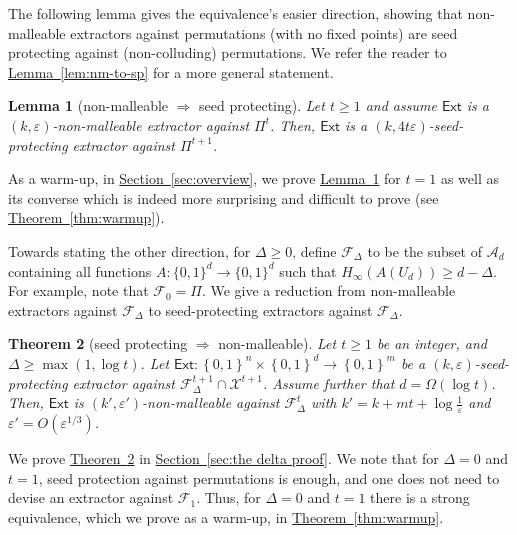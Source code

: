 \documentclass[11pt]{article}
\numberwithin{equation}{section}
\newtheorem{theorem}{Theorem}[section]
\newtheorem{lemma}[theorem]{Lemma}
\theoremstyle{definition}
\theoremstyle{plain}
\newcommand{\expref}[2]{\hyperref[#2]{#1~\ref{#2}}}
\newcommand{\ext}{\mathsf{Ext}}
\newcommand{\advfam}{\mathcal{A}}
\newcommand{\eps}{\varepsilon}
\newcommand{\perfam}{\Pi}
\newcommand{\nc}{\mathcal{X}}
\newcommand{\me}{{H_{\infty}}}
\newcommand{\set}[1]{\left\{{#1}\right\}}
\newcommand{\B}{\set{0,1}}
\begin{document}
The following lemma gives the equivalence's easier direction, showing that non-malleable extractors against permutations (with no fixed points) are seed protecting against (non-colluding) permutations. We refer the reader to \expref{Lemma}{lem:nm-to-sp} for a more general statement.

\begin{lemma}[non-malleable $\Longrightarrow$ seed protecting]\label{lem:intro nm is sp}
	Let $t \ge 1$ and assume $\ext$ is a $(k,\eps)$-non-malleable extractor
	against $\Pi^t$. Then, $\ext$ is a $(k,4t\eps)$-seed-protecting extractor against $\Pi^{t+1}$.
\end{lemma}

As a %
warm-up,  %
in \expref{Section}{sec:overview}, we prove \expref{Lemma}{lem:intro nm is sp} for $t=1$ as well as its converse which is indeed more surprising and difficult to prove (see \expref{Theorem}{thm:warmup}). 

Towards stating the other direction, 
for $\Delta \ge 0$, define $\mathcal{F}_{\Delta}$ to be the subset of $\advfam_d$ containing all functions $A \colon \{0,1\}^d \to \{0,1\}^d$ such that 
$\me(A(U_d)) \ge d-\Delta$. %
%
%
For example, note that $\mathcal{F}_0 = \perfam$. We
give a reduction from non-malleable extractors against $\mathcal{F}_\Delta$ to seed-protecting extractors against $\mathcal{F}_\Delta$. 

\begin{theorem}[seed protecting $\Longrightarrow$ non-malleable]\label{thm:last one}
	Let $t \ge 1$ be an integer, and $\Delta \ge \max(1,\log{t})$.
	Let $\ext\colon\B^{n}\times\B^{d}\rightarrow\B^m$ be a $(k,\eps)$-seed-protecting extractor against $\mathcal{F}^{t+1}_{\Delta} \cap \nc^{t+1}$. Assume further that $d = \Omega(\log{t})$. Then, $\ext$ is $(k',\eps')$-non-malleable against $\mathcal{F}_{\Delta}^t$ with $k' = k+mt+\log\frac1{\eps}$ and $\eps' = O(\eps^{1/3})$.
\end{theorem}

We prove \expref{Theoren}{thm:last one} in \expref{Section}{sec:the delta proof}. 
We note that for $\Delta = 0$ and $t = 1$, seed protection against
permutations is enough, and one does not need to devise an extractor against $\mathcal{F}_1$.
Thus, for $\Delta = 0$ and $t = 1$ there is a strong equivalence, which we prove 
as a warm-up, in \expref{Theorem}{thm:warmup}.


%

%



%
\end{document}

